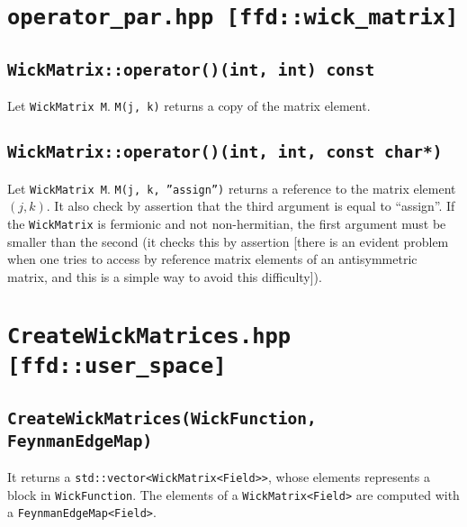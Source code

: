 \section{\texttt{operator\_par.hpp [ffd::wick\_matrix]}}
\subsection{\texttt{WickMatrix::operator()(int, int) const}}
Let \texttt{WickMatrix M}. \texttt{M(j, k)} returns a copy of the matrix element.
\subsection{\texttt{WickMatrix::operator()(int, int, const char*)}}
Let \texttt{WickMatrix M}. \texttt{M(j, k, ''assign'')} returns a reference to the matrix element $(j,k)$. It also check by assertion that the third argument is equal to ``assign''. If the \texttt{WickMatrix} is fermionic and not non-hermitian, the first argument must be smaller than the second (it checks this by assertion [there is an evident problem when one tries to access by reference matrix elements of an antisymmetric matrix, and this is a simple way to avoid this difficulty]).
\section{\texttt{CreateWickMatrices.hpp [ffd::user\_space]}}
\subsection{\texttt{CreateWickMatrices(WickFunction, FeynmanEdgeMap)}}
It returns a \texttt{std::vector<WickMatrix<Field>>}, whose elements represents a block in \texttt{WickFunction}. The elements of a \texttt{WickMatrix<Field>} are computed with a \texttt{FeynmanEdgeMap<Field>}.
